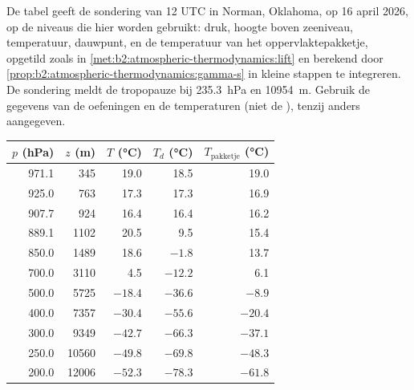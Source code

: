 \begin{problem}\label{pb:b2:atmospheric-thermodynamics:1}
De tabel geeft de sondering van 12 UTC in Norman, Oklahoma, op 16 april 2026, op de niveaus die
hier worden gebruikt: druk, hoogte boven zeeniveau, temperatuur, dauwpunt, en de temperatuur van het
oppervlaktepakketje, opgetild zoals in \cref{met:b2:atmospheric-thermodynamics:lift} en berekend door
\cref{prop:b2:atmospheric-thermodynamics:gamma-s} in kleine stappen te integreren. De sondering
meldt de tropopauze bij \qty{235.3}{hPa} en \qty{10954}{m}. Gebruik de gegevens van de oefeningen en
de temperaturen (niet de ), tenzij anders aangegeven.

\begin{center}
\small
\begin{tabular}{rrrrr}
\hline
$p$ (\unit{hPa}) & $z$ (\unit{m}) & $T$ (\unit{\celsius}) & $T_d$ (\unit{\celsius}) &
$T_{\text{pakketje}}$ (\unit{\celsius}) \\
\hline
971.1 & 345 & 19.0 & 18.5 & 19.0 \\
925.0 & 763 & 17.3 & 17.3 & 16.9 \\
907.7 & 924 & 16.4 & 16.4 & 16.2 \\
889.1 & 1102 & 20.5 & 9.5 & 15.4 \\
850.0 & 1489 & 18.6 & $-1.8$ & 13.7 \\
700.0 & 3110 & 4.5 & $-12.2$ & 6.1 \\
500.0 & 5725 & $-18.4$ & $-36.6$ & $-8.9$ \\
400.0 & 7357 & $-30.4$ & $-55.6$ & $-20.4$ \\
300.0 & 9349 & $-42.7$ & $-66.3$ & $-37.1$ \\
250.0 & 10560 & $-49.8$ & $-69.8$ & $-48.3$ \\
200.0 & 12006 & $-52.3$ & $-78.3$ & $-61.8$ \\
\hline
\end{tabular}
\end{center}


\end{problem}
